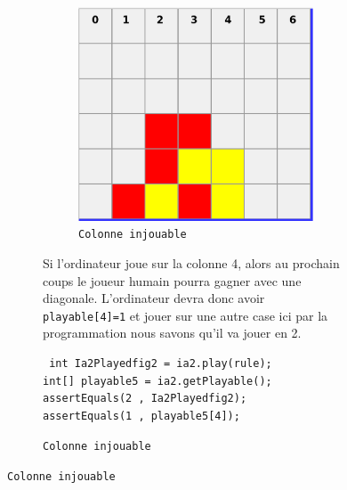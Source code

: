 \begin{figure}[H]
\begin{figure}[H]
\begin{figure}[H]
\begin{center}
  \includegraphics[scale=0.2]{playable10}
  \caption{\texttt{Colonne injouable}}
\end{center}
\end{figure}
Si l'ordinateur joue sur la colonne 4, alors au prochain coups le
joueur humain pourra gagner avec une diagonale. L'ordinateur devra donc avoir
\texttt{playable[4]=1} et jouer sur une autre case ici par la programmation nous savons qu'il va jouer en 2.

\begin{verbatim}
 int Ia2Playedfig2 = ia2.play(rule);
int[] playable5 = ia2.getPlayable();
assertEquals(2 , Ia2Playedfig2);
assertEquals(1 , playable5[4]);
\end{verbatim}



\end{figure}
\end{figure}
